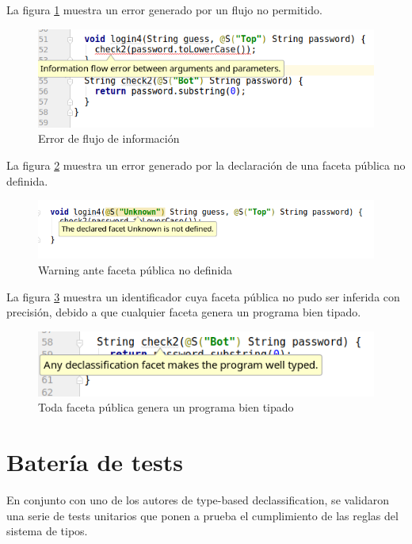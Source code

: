 La figura \ref{screen3} muestra un error generado por un flujo no permitido.

\begin{figure}[ht]
  \includegraphics[width=\textwidth]{imagenes/screen3.png}
  \caption{Error de flujo de información}
  \label{screen3}
\end{figure}

La figura \ref{screen4} muestra un error generado por la declaración de una faceta pública no definida.

\begin{figure}[ht]
  \includegraphics[width=\textwidth]{imagenes/screen4.png}
  \caption{Warning ante faceta pública no definida}
  \label{screen4}
\end{figure}
\clearpage
La figura \ref{screen5} muestra un identificador cuya faceta pública no pudo ser inferida con precisión, debido a que cualquier faceta genera un programa bien tipado.

\begin{figure}[ht]
  \includegraphics[width=\textwidth]{imagenes/screen5.png}
  \caption{Toda faceta pública genera un programa bien tipado}
  \label{screen5}
\end{figure}

\section{Batería de tests}
En conjunto con uno de los autores de type-based declassification, se validaron una serie de tests unitarios que ponen a prueba el cumplimiento de las reglas del sistema de tipos.

